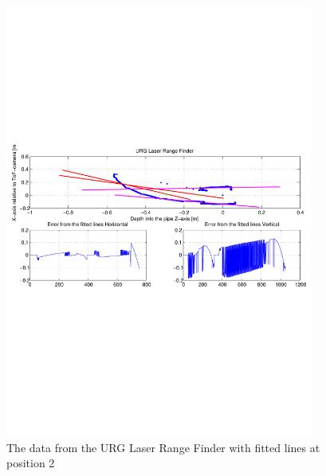 \begin{figure}[htbp]
    \centering
    \includegraphics[width=0.9\textwidth]{pics/pos21-control-urg-2d}
    \caption{The data from the URG Laser Range Finder with fitted lines at position 2}
    \label{chap7:fig-pos21-control-urg-2d}
\end{figure}


